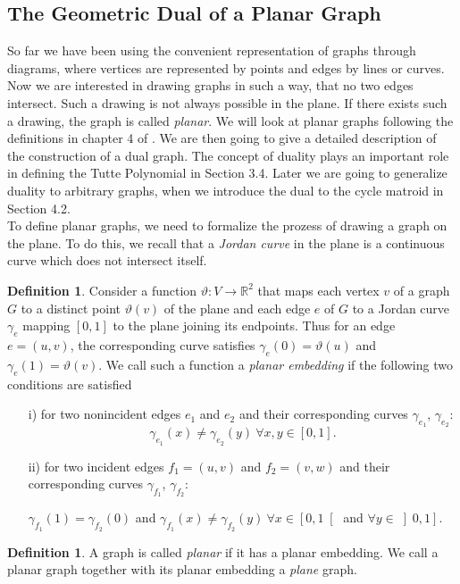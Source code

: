\documentclass[12pt,a4paper, twoside, autooneside=false]{scrartcl}
\theoremstyle{definition}
\newtheorem{definition}[theorem]{Definition}
\theoremstyle{remark}
\numberwithin{equation}{section}
\begin{document}
\subsection{The Geometric  Dual of a Planar Graph}
So far we have been using the convenient representation of graphs through diagrams, where vertices are represented by points and edges by lines or curves. Now we are interested in drawing graphs in such a way, that no two edges intersect. Such a drawing is not always possible in the plane. If there exists such a drawing, the graph is called \textit{planar}. We will look at planar graphs following the definitions in chapter 4 of \cite{GoRo2001}. We are then going to give a detailed description of the construction of a dual graph. The concept of duality plays an important role in defining the Tutte Polynomial in Section 3.4. Later we are going to generalize duality to arbitrary graphs, when we introduce the dual to the cycle matroid in Section 4.2. \\ \indent To define planar graphs, we need to formalize the prozess of drawing a graph on the plane. To do this, we recall that a \textit{Jordan curve} in the plane is a continuous curve which does not intersect itself.  
\begin{definition}
Consider a function $\vartheta: V \to \mathbb{R}^2$ that maps each vertex $v$ of a graph $G$ to a distinct point $\vartheta(v)$ of the plane and each edge $e$ of $G$ to a Jordan curve $\gamma_e$ mapping $[0,1]$ to the plane joining its endpoints. Thus for an edge $e = (u,v)$, the corresponding curve satisfies $\gamma_{e}(0) = \vartheta(u)$ and $\gamma_{e}(1) = \vartheta(v)$. We call such a function a \textit{planar embedding} if the following two conditions are satisfied 
\begin{itemize}
\item[i)] for two nonincident edges $e_1$ and $e_2$ and their corresponding curves $\gamma_{e_1}$, $\gamma_{e_2}$: 
\[
\gamma_{e_1}(x) \neq \gamma_{e_2}(y) \ \forall x,y \in [0,1].
\]
\item[ii)] for two incident edges $f_1 = (u,v)$ and $f_2 = (v,w)$ and their corresponding curves $\gamma_{f_1}$, $\gamma_{f_2}$: 
\begin{center}
$\gamma_{f_1}(1) = \gamma_{f_2}(0)$ and $\gamma_{f_1}(x) \neq \gamma_{f_2}(y) \ \forall x \in \left[0, 1\right[ $ and $ \forall y \in \left]0,1\right].$
\end{center}
\end{itemize}
\end{definition}
\begin{definition}
A graph is called \textit{planar} if it has a planar embedding. We call a planar graph together with its planar embedding a \textit{plane} graph.
\end{definition}
\end{document}
